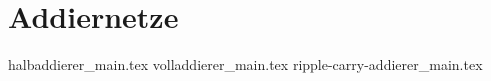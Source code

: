 
\part{Addiernetze}
\label{part-addiernetze}

{halbaddierer_main.tex}
{volladdierer_main.tex}
{ripple-carry-addierer_main.tex}